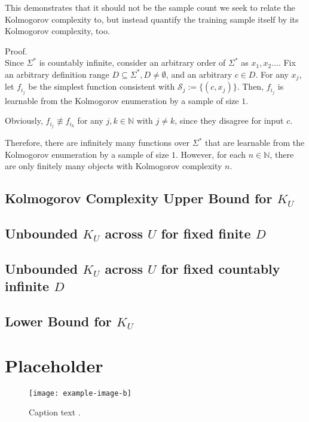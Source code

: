 This demonstrates that it should not be the sample count we seek to relate the Kolmogorov complexity to, but instead quantify the training sample itself by its Kolmogorov complexity, too.

Proof.\\
Since $\Sigma^{*}$ is countably infinite, consider an arbitrary order of $\Sigma^{*}$ as $x_1,x_2\dots$.
Fix an arbitrary definition range $D\subseteq\Sigma^{*}, D \neq \emptyset$, and an arbitrary $c\in D$.
For any $x_j$, let $f_{i_{j}}$ be the simplest function consistent with $\mathcal{S}_j:=\{(c,x_j)\}$. Then, $f_{i_{j}}$ is learnable from the Kolmogorov enumeration by a sample of size $1$.

Obviously, $f_{i_{j}}\not \equiv f_{i_{k}}$ for any $j,k\in\mathbb{N}$ with $j\neq k$, since they disagree for input $c$.

Therefore, there are infinitely many functions over $\Sigma^{*}$ that are learnable from the Kolmogorov enumeration by a sample of size $1$. However, for each $n\in\mathbb{N}$, there are only finitely many objects with Kolmogorov complexity $n$. 
\subsection{Kolmogorov Complexity Upper Bound for $K_U$}
\subsection{Unbounded $K_U$ across $U$ for fixed finite $D$}
\subsection{Unbounded $K_U$ across $U$ for fixed countably infinite $D$}
\subsection{Lower Bound for $K_U$}
\section{Placeholder}
\begin{figure}[t]
\centering\texttt{[image: example-image-b]} 
\caption[Short figure name.]{Caption text \cite{godel1931formal}.}\label{example-image-b}
\end{figure}

